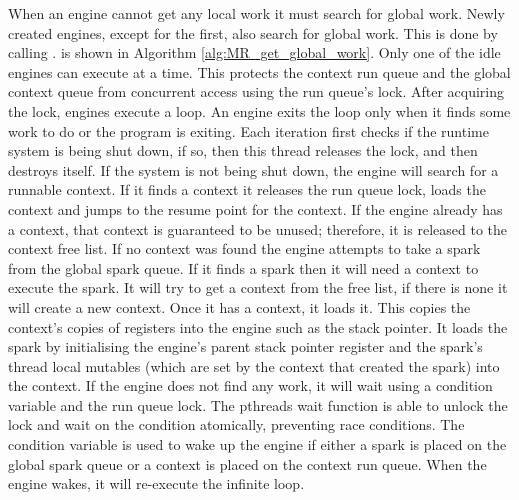 When an engine cannot get any local work it must search for global work.
Newly created engines, except for the first, also search for global work.
This is done by calling \getglobalwork.
\getglobalwork is shown in Algorithm \ref{alg:MR_get_global_work}.
Only one of the idle engines can execute \getglobalwork at a time.
This protects the context run queue and the global context queue from
concurrent access using the run queue's lock.
After acquiring the lock,
engines execute a loop.
An engine exits the loop only when it finds some work to do or the
program is exiting.
Each iteration first checks if the runtime system is being shut down,
if so,
then this thread releases the lock,
and then destroys itself.
If the system is not being shut down,
the engine will search for a runnable context.
If it finds a context it releases the run queue lock, loads the context
and jumps to the resume point for the context.
If the engine already has a context,
that context is guaranteed to be unused;
therefore, it is released to the context free list.
If no context was found the engine attempts to take a spark from the global
spark queue.
If it finds a spark then it will need a context to execute the spark.
It will try to get a context from the free list, if there is none it will
create a new context.
Once it has a context,
it loads it.
This copies the context's copies of registers into the engine such as the
stack pointer.
It loads the spark by initialising the engine's parent stack pointer
register and the spark's thread local mutables
(which are set by the context that created the spark)
into the context.
If the engine does not find any work,
it will wait using a condition variable and the run queue lock.
The pthreads wait function is able to unlock the lock and wait on the
condition atomically, preventing race conditions.
The condition variable is used to wake up the engine if either a spark is
placed on the global spark queue or a context is placed on the context run
queue.
When the engine wakes,
it will re-execute the infinite loop.


